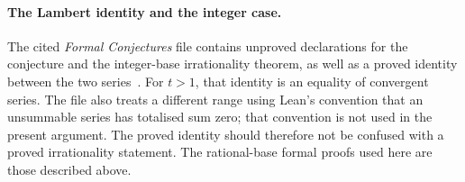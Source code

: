 \documentclass[11pt]{article}
\begin{document}
\paragraph{The Lambert identity and the integer case.}
The cited \emph{Formal Conjectures} file contains unproved declarations
for the conjecture and the integer-base irrationality theorem, as well
as a proved identity between the two series~\cite{formalconjectures1049}.
For $t>1$, that identity is an equality of convergent series. The file
also treats a different range using Lean's convention that an
unsummable series has totalised sum zero; that convention is not used
in the present argument. The proved identity should therefore not be
confused with a proved irrationality statement. The rational-base
formal proofs used here are those described above.
\end{document}

